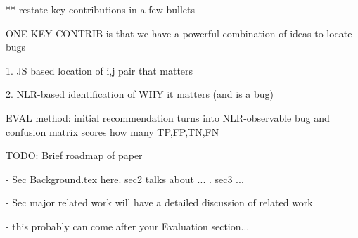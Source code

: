 ** restate key contributions in a few bullets

ONE KEY CONTRIB is that we have a powerful combination of ideas to locate bugs

1. JS based location of i,j pair that matters

2. NLR-based identification of WHY it matters (and is a bug)

EVAL method:
initial recommendation turns into NLR-observable bug and confusion matrix scores how many TP,FP,TN,FN


TODO: Brief roadmap of paper

- Sec Background.tex here. sec2 talks about ... . sec3 ...

- Sec major related work will have a detailed discussion of related work

- this probably can come after your Evaluation section...
 

